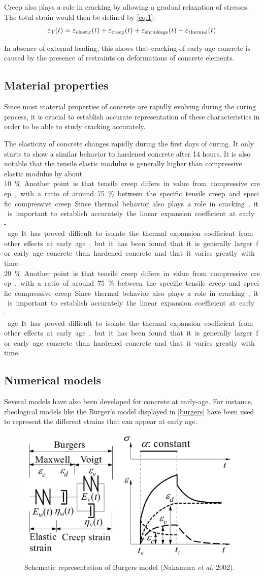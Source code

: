 \documentclass[a4paper,11pt]{memoir}
\begin{document}
Creep also plays a role in cracking by allowing a gradual relaxation of
stresses. The total strain would then be defined by \autoref{eq:1}:
\begin{equation}
  \epsilon_{\text T}(t) =
  \epsilon_{\text{elastic}}(t) +
  \epsilon_{\text{creep}}(t) +
  \epsilon_{\text{shrinkage}}(t) +
  \epsilon_{\text{thermal}}(t)
  \label{eq:1}
\end{equation}

In absence of external loading, this shows that cracking of early-age concrete
is caused by the presence of restraints on deformations of concrete elements.

\subsection{Material properties}
Since most material properties of concrete are rapidly evolving during the
curing process, it is crucial to establish accurate representation of these
characteristics in order to be able to study cracking accurately.

The elasticity of concrete changes rapidly during the first days of curing. It
only starts to show a similar behavior to hardened concrete after 14 hours.
It is also notable that the tensile elastic modulus is generally higher than
compressive elastic modulus by about \SIrange{10}{20}\percent.

Another point is that tensile creep differs in value from compressive creep,
with a ratio of around \SI{75}\percent between the specific tensile creep and
specific compressive creep.

Since thermal behavior also plays a role in cracking, it is important to
establish accurately the linear expansion coefficient at early-age. It has
proved difficult to isolate the thermal expansion coefficient from other
effects at early age, but it has been found that it is generally larger for
early age concrete than hardened concrete and that it varies greatly with time.

\subsection{Numerical models}

Several models have also been developed for concrete at early-age. For
instance, rheological models like the Burger's model displayed in
\autoref{burgers} have been used to represent the different strains that can
appear at early age.

\begin{figure}
  \centering
  \includegraphics[width=.5\linewidth]{burgers}
  \caption{Schematic representation of Burgers model (Nakamura \textit{et al.}
  2002).}\label{burgers}
\end{figure}
\end{document}
